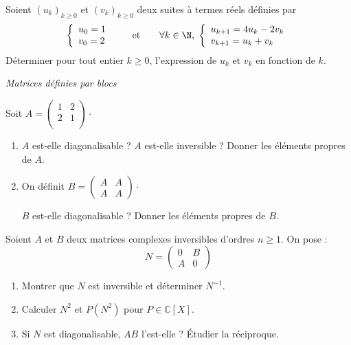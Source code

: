 \documentclass[a4paper,10pt]{report}
\begin{document}
\begin{Exercice}{} Soient $(u_k)_{k \geq 0}$ et $(v_k)_{k \geq 0}$ deux suites \`a termes r\'eels d\'efinies par
$$\left\{\begin{array}{l}u_0=1\\ v_0=2\end{array}\right.\qquad\hbox{et}\qquad \forall k\in\N,\;\left\{\begin{array}{l}u_{k+1}=4u_k-2v_k\\
v_{k+1}=u_k+v_k\end{array}\right.$$
Déterminer pour tout entier $k \geq 0$, l'expression de $u_k$ et $v_k$ en fonction de $k$.
\end{Exercice}


\medskip

\begin{center}
\textit{{ {\large Matrices définies par blocs}}}
\end{center}

\medskip

\begin{Exercice}{} Soit $A= \begin{pmatrix}
1& 2 \\
2 & 1 \\
\end{pmatrix}\cdot$
\begin{enumerate}
\item $A$ est-elle diagonalisable ? $A$ est-elle inversible ? Donner les éléments propres de $A$.
\item  On définit $B = \begin{pmatrix}
A & A \\
A & A 
\end{pmatrix}\cdot$

$B$ est-elle diagonalisable ? Donner les éléments propres de $B$.
\end{enumerate}
\end{Exercice}


\begin{Exercice}{} Soient $A$ et $B$ deux matrices complexes inversibles d'ordres $n \geq 1$. On pose :
$$ N = \begin{pmatrix}
0 & B \\
A & 0
\end{pmatrix}$$
\begin{enumerate}
\item Montrer que $N$ est inversible et déterminer $N^{-1}$.
\item Calculer $N^2$ et $P(N^2)$ pour $P \in \mathbb{C}[X]$.
\item Si $N$ est diagonalisable, $AB$ l'est-elle ? Étudier la réciproque.
\end{enumerate}
\end{Exercice}
\end{document}
